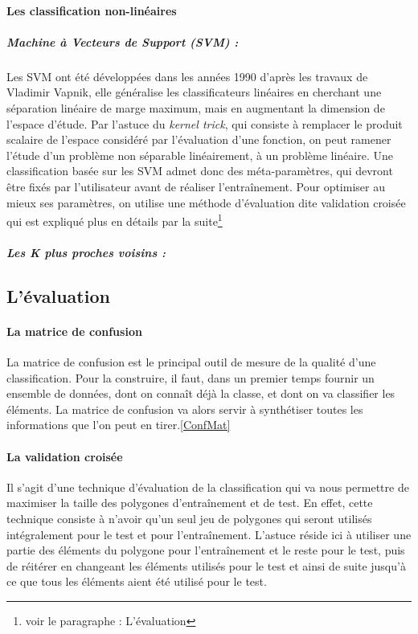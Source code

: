 \documentclass[a4paper,10pt]{report}
\begin{document}
\paragraph{Les classification non-linéaires}
\subparagraph{Machine à Vecteurs de Support (SVM) :}

Les SVM ont été développées dans les années 1990 d'après les travaux de Vladimir Vapnik, elle généralise les classificateurs linéaires en cherchant une séparation linéaire de marge maximum, mais en augmentant la dimension de l'espace d'étude. Par l'astuce du \textit{kernel trick}\cite{aizermanSVM}, qui consiste à remplacer le produit scalaire de l'espace considéré par l'évaluation d'une fonction, on peut ramener l'étude d'un problème non séparable linéairement, à un problème linéaire. Une classification basée sur les SVM admet donc des méta-paramètres, qui devront être fixés par l'utilisateur avant de réaliser l'entraînement. Pour optimiser au mieux ses paramètres, on utilise une méthode d'évaluation dite validation croisée qui est expliqué plus en détails par la suite\footnote{voir le paragraphe : L'évaluation}
\subparagraph{Les K plus proches voisins :}
\subsection{L'évaluation}
\paragraph{La matrice de confusion\newline}
La matrice de confusion est le principal outil de mesure de la qualité d'une classification. Pour la construire, il faut, dans un premier temps fournir un ensemble de données, dont on connaît déjà la classe, et dont on va classifier les éléments. La matrice de confusion va alors servir à synthétiser toutes les informations que l'on peut en tirer.\ref{ConfMat}

\newpage
\paragraph{La validation croisée\newline}
Il s'agit d'une technique d'évaluation de la classification qui va nous permettre de maximiser la taille des polygones d'entraînement et de test. En effet, cette technique consiste à n'avoir qu'un seul jeu de polygones qui seront utilisés intégralement pour le test et pour l'entraînement. L'astuce réside ici à utiliser une partie des éléments du polygone pour l'entraînement et le reste pour le test, puis de réitérer en changeant les éléments utilisés pour le test et ainsi de suite jusqu'à ce que tous les éléments aient été utilisé pour le test.

\end{document}
